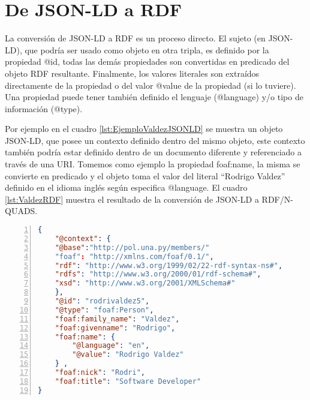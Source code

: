 \section{De JSON-LD a RDF}

La conversión de JSON-LD a RDF es un proceso directo. El sujeto (en JSON-LD), que podría ser usado como objeto en otra tripla, es definido por la propiedad @id, todas las demás propiedades son convertidas en predicado del objeto RDF resultante. Finalmente, los valores literales son extraídos directamente de la propiedad o del valor @value de la propiedad (si lo tuviere). Una propiedad puede tener también definido el lenguaje (@language) y/o tipo de información (@type).

Por ejemplo en el cuadro \ref{lst:EjemploValdezJSONLD} se muestra un objeto JSON-LD, que posee un contexto definido dentro del mismo objeto, este contexto también podría estar definido dentro de un documento diferente y referenciado a través de una URI. Tomemos como ejemplo la propiedad foaf:name, la misma se convierte en predicado y el objeto toma el valor del literal “Rodrigo Valdez” definido en el idioma inglés según especifica @language. El cuadro \ref{lst:ValdezRDF} muestra el resultado de la conversión de JSON-LD a RDF/N-QUADS.


\begin{minipage}{\textwidth}
    \begin{lstlisting}[captionpos=b, caption=Objeto JSON-LD. , label=lst:EjemploValdezJSONLD, language=json,firstnumber=1,  numbers=left,  numberstyle=\tiny\color{mygray},
    basicstyle=\footnotesize\ttfamily,frame=single]
{
	"@context": {
	"@base":"http://pol.una.py/members/"
	"foaf": "http://xmlns.com/foaf/0.1/",
	"rdf": "http://www.w3.org/1999/02/22-rdf-syntax-ns#",
	"rdfs": "http://www.w3.org/2000/01/rdf-schema#",
	"xsd": "http://www.w3.org/2001/XMLSchema#"
	},
	"@id": "rodrivaldez5",
	"@type": "foaf:Person",
	"foaf:family_name": "Valdez",
	"foaf:givenname": "Rodrigo",
	"foaf:name": {
		"@language": "en",
		"@value": "Rodrigo Valdez"
	} ,
	"foaf:nick": "Rodri",
	"foaf:title": "Software Developer"
}

        \end{lstlisting}
    \end{minipage}


